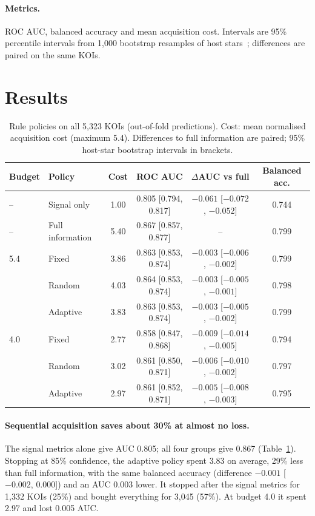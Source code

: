 \documentclass[11pt,a4paper]{article}
\begin{document}
\paragraph{Metrics.} ROC AUC, balanced accuracy and mean acquisition cost. Intervals are 95\% percentile intervals
from 1,000 bootstrap resamples of host stars~\cite{efron1993bootstrap}; differences are paired on the same KOIs.

\section{Results}

\begin{table}[t]
\centering
\small
\caption{Rule policies on all 5,323 KOIs (out-of-fold predictions). Cost: mean normalised acquisition cost (maximum
5.4). Differences to full information are paired; 95\% host-star bootstrap intervals in brackets.}
\label{tab:main}
\setlength{\tabcolsep}{4pt}
\begin{tabular}{llcccc}
\toprule
Budget & Policy & Cost & ROC AUC & $\Delta$AUC vs full & Balanced acc. \\
\midrule
-- & Signal only & 1.00 & 0.805 [0.794, 0.817] & $-0.061$ [$-0.072$, $-0.052$] & 0.744 \\
-- & Full information & 5.40 & 0.867 [0.857, 0.877] & -- & 0.799 \\
\midrule
5.4 & Fixed & 3.86 & 0.863 [0.853, 0.874] & $-0.003$ [$-0.006$, $-0.002$] & 0.799 \\
 & Random & 4.03 & 0.864 [0.853, 0.874] & $-0.003$ [$-0.005$, $-0.001$] & 0.798 \\
 & Adaptive & 3.83 & 0.863 [0.853, 0.874] & $-0.003$ [$-0.005$, $-0.002$] & 0.799 \\
\midrule
4.0 & Fixed & 2.77 & 0.858 [0.847, 0.868] & $-0.009$ [$-0.014$, $-0.005$] & 0.794 \\
 & Random & 3.02 & 0.861 [0.850, 0.871] & $-0.006$ [$-0.010$, $-0.002$] & 0.797 \\
 & Adaptive & 2.97 & 0.861 [0.852, 0.871] & $-0.005$ [$-0.008$, $-0.003$] & 0.795 \\
\bottomrule
\end{tabular}
\end{table}

\paragraph{Sequential acquisition saves about 30\% at almost no loss.} The signal metrics alone give AUC 0.805; all
four groups give 0.867 (Table~\ref{tab:main}). Stopping at 85\% confidence, the adaptive policy spent 3.83 on
average, 29\% less than full information, with the same balanced accuracy (difference $-0.001$ [$-0.002$, $0.000$])
and an AUC 0.003 lower. It stopped after the signal metrics for 1,332 KOIs (25\%) and bought everything for 3,045
(57\%). At budget 4.0 it spent 2.97 and lost 0.005 AUC.
\end{document}
